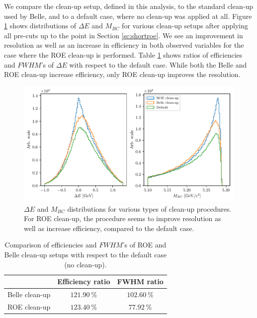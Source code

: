 \documentclass[  headings=standardclasses,
  headings=big,oneside,a4paper,openany,12pt]{scrbook}
\begin{document}
We compare the clean-up setup, defined in this analysis, to the standard clean-up used by Belle, and to a default case, where no clean-up was applied at all. Figure \ref{fig:roe_opt} shows distributions of $\Delta E$ and $M_{BC}$ for various clean-up setups after applying all pre-cuts up to the point in Section \ref{sc:shortroe}. We see an improvement in resolution as well as an increase in efficiency in both observed variables for the case where the ROE clean-up is performed. Table \ref{tab:roeeff} shows ratios of efficiencies and $FWHM$'s of $\Delta E$ with respect to the default case. While both the Belle and ROE clean-up increase efficiency, only ROE clean-up improves the resolution.


\begin{figure}[H]
\centering
\captionsetup{width=0.8\linewidth}
\includegraphics[width=\linewidth]{fig/roe_opt}
\caption{$\Delta E$ and $M_{BC}$ distributions for various types of clean-up procedures. For ROE clean-up, the procedure seems to improve resolution as well as increase efficiency, compared to the default case.}
\label{fig:roe_opt}
\end{figure}

\begin{table}[H]
\centering
\begin{tabular}{|c|c|c|}
\hline
 & Efficiency ratio & FWHM ratio \\
 \hline 
 Belle clean-up & $121.90~\%$  & $102.60~\%$  \\
 \hline
 ROE clean-up & $123.40~\%$ & $77.92~\%$ \\
 \hline
\end{tabular}
\caption{Comparison of efficiencies and $FWHM$'s of ROE and Belle clean-up setups with respect to the default case (no clean-up).}
\label{tab:roeeff}
\end{table}
\end{document}
